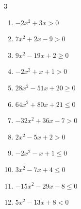 \begin{multicols}{3}
\begin{enumerate}

  \item $-2x^{2}+3x>0$


  \item $7x^{2}+2x-9>0$


  \item $9x^{2}-19x+2\geq 0$


  \item $-2x^{2}+x+1>0$


  \item $28x^{2}-51x+20\geq 0$


\columnbreak %

\resetques

  \item $64x^{2}+80x+21\leq 0$


  \item $-32x^{2}+36x-7>0$


  \item $2x^{2}-5x+2>0$


  \item $-2x^{2}-x+1\leq 0$


  \item $3x^{2}-7x+4\leq 0$


  \item $-15x^{2}-29x-8\leq 0$


  \item $5x^{2}-13x+8<0$


\end{enumerate}
\end{multicols}
